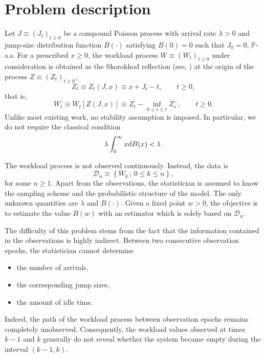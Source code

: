 \documentclass[12pt]{article}
\newcommand{\1}{\mathbf{1}}
\begin{document}
\section{Problem description}\label{sec: problem}

Let $J\equiv(J_t)_{t\geq0}$ be a compound Poisson process with arrival rate $\lambda>0$ and jump-size distribution function $B(\cdot)$ satisfying $B(0)=0$ such that $J_0=0$, $\mathbb{P}$-a.s. For a prescribed $x\geq0$, the workload process $W\equiv(W_t)_{t\geq0}$ under consideration is obtained as the Skorokhod reflection (see, \cite{Kella2006}) at the origin of the process $Z\equiv(Z_t)_{t\geq0}$,
\begin{equation}\label{eq: Z}
Z_t\equiv Z_t\left(J,x\right)\equiv x +J_t-t,\qquad t\geq0,
\end{equation}
that is,
\begin{equation}\label{eq: W}
W_t\equiv W_t\left[Z(J,x)\right]\equiv Z_t-\inf_{0\leq s\leq t} Z_s^-,\qquad t\geq0.    
\end{equation}
Unlike most existing work, no stability assumption is imposed.
In particular, we do not require the classical condition
\[
\lambda \int_0^\infty x{\rm d}B(x)<1.
\]

The workload process is not observed continuously. Instead, the data is
\begin{equation*}
\mathcal{D}_n\equiv\left\{
W_k
\,;\,
0\leq k\leq n
\right\},    
\end{equation*}
for some $n\geq1$. Apart from the observations, the statistician is assumed to know the
sampling scheme and the probabilistic structure of the model.
The only unknown quantities are $\lambda$ and $B(\cdot)$. Given a fixed point $w>0$, the objective is to estimate the value $B(w)$ with an estimator which is solely based on $\mathcal{D}_n$.

The difficulty of this problem stems from the fact that the information contained in the observations is highly indirect. Between two consecutive observation epochs, the statistician cannot determine
\begin{itemize}
\item the number of arrivals,

\item the corresponding jump sizes,

\item the amount of idle time.
\end{itemize}

Indeed, the path of the workload process between observation epochs remains completely unobserved. Consequently, the workload values observed at times $k-1$ and $k$ generally do not reveal whether the system became empty during the interval $(k-1,k)$.
\end{document}
